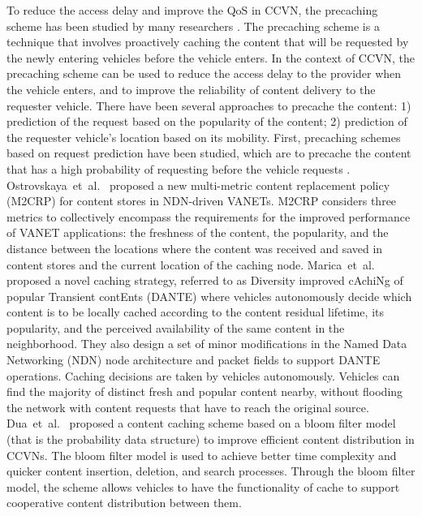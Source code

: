 \documentclass{ieeeaccess}
\begin{document}
To reduce the access delay and improve the QoS in CCVN, the precaching scheme has been studied by many researchers \cite{Ostrovskaya2018, Marica2021, Amit2019, Zhe2020, Park2019, Khelifi2018}.
The precaching scheme is a technique that involves proactively caching the content that will be requested by the newly entering vehicles before the vehicle enters.
In the context of CCVN, the precaching scheme can be used to reduce the access delay to the provider when the vehicle enters, and to improve the reliability of content delivery to the requester vehicle.
There have been several approaches to precache the content: 1) prediction of the request based on the popularity of the content; 2) prediction of the requester vehicle's location based on its mobility.
First, precaching schemes based on request prediction have been studied, which are to precache the content that has a high probability of requesting before the vehicle requests \cite{Ostrovskaya2018, Marica2021, Amit2019}.
Ostrovskaya~et~al.~\cite{Ostrovskaya2018} proposed a new multi-metric content replacement policy (M2CRP) for content stores in NDN-driven VANETs. M2CRP considers three metrics to collectively encompass the requirements for the improved performance of VANET applications: the freshness of the content, the popularity, and the distance between the locations where the content was received and saved in content stores and the current location of the caching node.
Marica~et~al.~\cite{Marica2021} proposed a novel caching strategy, referred to as Diversity improved cAchiNg of popular Transient contEnts (DANTE) where vehicles autonomously decide which content is to be locally cached according to the content residual lifetime, its popularity, and the perceived availability of the same content in the neighborhood. They also design a set of minor modifications in the Named Data Networking (NDN) node architecture and packet fields to support DANTE operations. Caching decisions are taken by vehicles autonomously. Vehicles can find the majority of distinct fresh and popular content nearby, without flooding the network with content requests that have to reach the original source.
Dua~et~al.~\cite{Amit2019} proposed a content caching scheme based on a bloom filter model (that is the probability data structure) to improve efficient content distribution in CCVNs. The bloom filter model is used to achieve better time complexity and quicker content insertion, deletion, and search processes. Through the bloom filter model, the scheme allows vehicles to have the functionality of cache to support cooperative content distribution between them.
\end{document}
